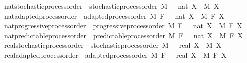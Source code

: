 \begin{isabellebody}
\isanewline
\isanewline
\isanewline
{}\isamarkupfalse%
\ nat{\isacharunderscore}{\kern0pt}stochastic{\isacharunderscore}{\kern0pt}process{\isacharunderscore}{\kern0pt}order\ {\isacharequal}{\kern0pt}\ stochastic{\isacharunderscore}{\kern0pt}process{\isacharunderscore}{\kern0pt}order\ M\ {\isachardoublequoteopen}{}\ {\isacharcolon}{\kern0pt}{\isacharcolon}{\kern0pt}\ nat{\isachardoublequoteclose}\ X\ \ M\ X\isanewline
{}\isamarkupfalse%
\ nat{\isacharunderscore}{\kern0pt}adapted{\isacharunderscore}{\kern0pt}process{\isacharunderscore}{\kern0pt}order\ {\isacharequal}{\kern0pt}\ adapted{\isacharunderscore}{\kern0pt}process{\isacharunderscore}{\kern0pt}order\ M\ F\ {\isachardoublequoteopen}{}\ {\isacharcolon}{\kern0pt}{\isacharcolon}{\kern0pt}\ nat{\isachardoublequoteclose}\ X\ \ M\ F\ X\isanewline
{}\isamarkupfalse%
\ nat{\isacharunderscore}{\kern0pt}progressive{\isacharunderscore}{\kern0pt}process{\isacharunderscore}{\kern0pt}order\ {\isacharequal}{\kern0pt}\ progressive{\isacharunderscore}{\kern0pt}process{\isacharunderscore}{\kern0pt}order\ M\ F\ {\isachardoublequoteopen}{}\ {\isacharcolon}{\kern0pt}{\isacharcolon}{\kern0pt}\ nat{\isachardoublequoteclose}\ X\ \ M\ F\ X\isanewline
{}\isamarkupfalse%
\ nat{\isacharunderscore}{\kern0pt}predictable{\isacharunderscore}{\kern0pt}process{\isacharunderscore}{\kern0pt}order\ {\isacharequal}{\kern0pt}\ predictable{\isacharunderscore}{\kern0pt}process{\isacharunderscore}{\kern0pt}order\ M\ F\ {\isachardoublequoteopen}{}\ {\isacharcolon}{\kern0pt}{\isacharcolon}{\kern0pt}\ nat{\isachardoublequoteclose}\ X\ \ M\ F\ X\isanewline
\isanewline
\isanewline
\isanewline
{}\isamarkupfalse%
\ real{\isacharunderscore}{\kern0pt}stochastic{\isacharunderscore}{\kern0pt}process{\isacharunderscore}{\kern0pt}order\ {\isacharequal}{\kern0pt}\ stochastic{\isacharunderscore}{\kern0pt}process{\isacharunderscore}{\kern0pt}order\ M\ {\isachardoublequoteopen}{}\ {\isacharcolon}{\kern0pt}{\isacharcolon}{\kern0pt}\ real{\isachardoublequoteclose}\ X\ \ M\ X\isanewline
{}\isamarkupfalse%
\ real{\isacharunderscore}{\kern0pt}adapted{\isacharunderscore}{\kern0pt}process{\isacharunderscore}{\kern0pt}order\ {\isacharequal}{\kern0pt}\ adapted{\isacharunderscore}{\kern0pt}process{\isacharunderscore}{\kern0pt}order\ M\ F\ {\isachardoublequoteopen}{}\ {\isacharcolon}{\kern0pt}{\isacharcolon}{\kern0pt}\ real{\isachardoublequoteclose}\ X\ \ M\ F\ X\isanewline

\end{isabellebody}
